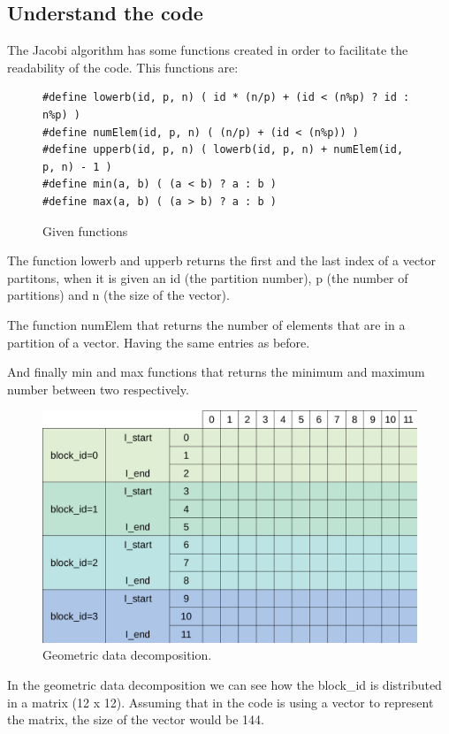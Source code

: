 \documentclass[12pt, a4paper]{article}
\begin{document}
\subsection{Understand the code}
The Jacobi algorithm has some functions created in order to facilitate the readability of the code. This functions are:

\begin{figure}[H]
\begin{lstlisting}
#define lowerb(id, p, n) ( id * (n/p) + (id < (n%p) ? id : n%p) )
#define numElem(id, p, n) ( (n/p) + (id < (n%p)) )
#define upperb(id, p, n) ( lowerb(id, p, n) + numElem(id, p, n) - 1 )
#define min(a, b) ( (a < b) ? a : b )
#define max(a, b) ( (a > b) ? a : b )
\end{lstlisting}
\caption{Given functions}
\end{figure}

The function lowerb and upperb returns the first and the last index of a vector partitons, when it is given an id (the partition number), p (the number of partitions) and n (the size of the vector).

The function numElem that returns the number of elements that are in a partition of a vector. Having the same entries as before.

And finally min and max functions that returns the minimum and maximum number between two respectively.

\begin{figure}[H]
	\centering
	\includegraphics[scale=0.30]{./images/data_decomposition.png}
	\caption{Geometric data decomposition.}
	\label{fig:geometricdatadecomposition}
\end{figure}

In the geometric data decomposition we can see how the block\_id is distributed in a matrix (12 x 12). Assuming that in the code is using a vector to represent the matrix, the size of the vector would be 144.
\end{document}
